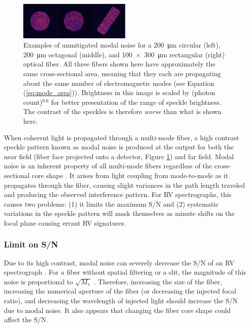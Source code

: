 \documentclass[11pt]{article}
\begin{document}
\begin{figure}
\centering
	\includegraphics[width=0.5\textwidth]{images/fiber_example.pdf}
	\caption{Examples of unmitigated modal noise for a \SI{200}{\micro\meter} circular (left), \SI{200}{\micro\meter} octagonal (middle), and \SI{100x300}{\micro\meter} rectangular (right) optical fiber. All three fibers shown here have approximately the same cross-sectional area, meaning that they each are propagating about the same number of electromagnetic modes (see Equation (\ref{eq:mode_area})). Brightness in this image is scaled by (photon count)$^{0.6}$ for better presentation of the range of speckle brightness. The contrast of the speckles is therefore \textit{worse} than what is shown here.}
\label{fig:fiber_example}
\end{figure}

When coherent light is propagated through a multi-mode fiber, a high contrast speckle pattern known as modal noise is produced at the output for both the near field (fiber face projected onto a detector, Figure \ref{fig:fiber_example}) and far field. Modal noise is an inherent property of all multi-mode fibers regardless of the cross-sectional core shape \cite{Sablowski2016}. It arises from light coupling from mode-to-mode as it propagates through the fiber, causing slight variances in the path length traveled and producing the observed interference pattern. For RV spectrographs, this causes two problems: (1) it limits the maximum S/N and (2) systematic variations in the speckle pattern will mask themselves as minute shifts on the focal plane causing errant RV signatures.

\subsubsection{Limit on S/N}

Due to its high contrast, modal noise can severely decrease the S/N of an RV spectrograph \cite{Epworth1978, Baudrand2001, Lemke2011, Iuzzolino2014}. For a fiber without spatial filtering or a slit, the magnitude of this noise is proportional to $\sqrt{M_s}$ \cite{Goodman1981}. Therefore, increasing the size of the fiber, increasing the numerical aperture of the fiber (or decreasing the injected focal ratio), and decreasing the wavelength of injected light should increase the S/N due to modal noise. It also appears that changing the fiber core shape could affect the S/N.
\end{document}
